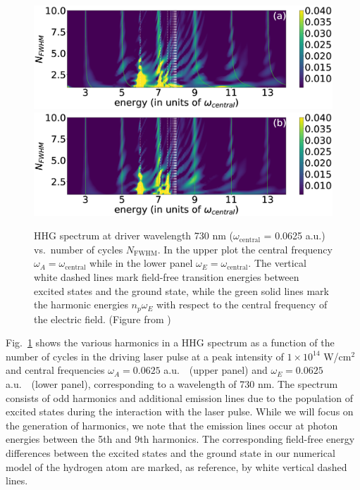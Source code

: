 \begin{figure}[!ht]
\centering
    \includegraphics[width=0.8\linewidth]{figs/Frequency_shift/HHG_w_A.eps}       
    \includegraphics[width=0.8\linewidth]{figs/Frequency_shift/HHG_w_E.eps}
\caption{
HHG spectrum at driver wavelength 730 nm ($\omega_\text{central}$ = 0.0625 a.u.) vs.\ number of cycles $N_\text{FWHM}$. In the upper plot the central frequency $\omega_A = \omega_\text{central}$ while in the lower panel $\omega_E = \omega_\text{central}$. The vertical white dashed lines mark field-free transition energies between excited states and the ground state, while the green solid lines mark the harmonic energies $n_p\omega_E$ with respect to the central frequency of the electric field. (Figure from \cite{venzke2018_Central})
}
  \label{fig:HHG}
\end{figure}

Fig.~\ref{fig:HHG} shows the various harmonics in a HHG spectrum as a function of the number of cycles in the driving laser pulse at a peak intensity of $1\times 10^{14}$ W/cm$^2$ and central frequencies $\omega_A=0.0625$ a.u.\ \ (upper panel) and $\omega_E=0.0625$ a.u.\ \ (lower panel), corresponding to a wavelength of 730 nm. The spectrum consists of odd harmonics and additional emission lines due to the population of excited states during the interaction with the laser pulse. While we will focus on the generation of harmonics, we note that the emission lines occur at photon energies between the 5th and 9th harmonics. The corresponding field-free energy differences between the excited states and the ground state in our numerical model of the hydrogen atom are marked, as reference, by white vertical dashed lines.

